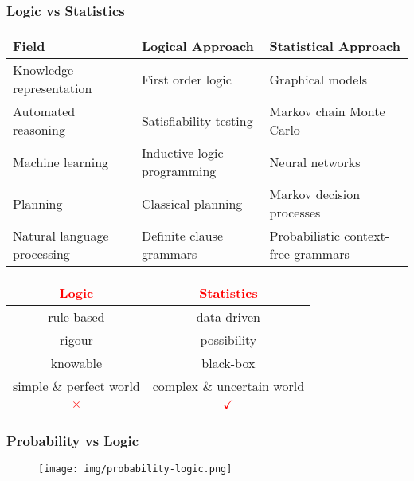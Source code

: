 \documentclass[UTF8,11pt,colorlinks,compress,openany]{beamer}%
\begin{document}
\begin{frame}\frametitle{Logic vs Statistics}%
\begin{table}\centering
\begin{tabu}{p{.29\textwidth}|p{.29\textwidth}|p{.3\textwidth}}
\hline
\textbf{Field} & \textbf{Logical Approach} & \textbf{Statistical Approach}\\
\hline
Knowledge representation & First order logic & Graphical models\\
\hline
Automated reasoning & Satisfiability testing & Markov chain Monte Carlo\\
\hline
Machine learning & Inductive logic programming & Neural networks\\
\hline
Planning & Classical planning & Markov decision processes\\
\hline
Natural language processing & Definite clause grammars & Probabilistic context-free grammars\\
\hline
\end{tabu}
\end{table}
	\begin{table}
		\centering
		\begin{tabu}{c|c}
			\hline
			\large\textcolor{red}{Logic} &\large\textcolor{red}{Statistics}\\
			\hline
			rule-based &data-driven\\
			\hline
			rigour &possibility\\
			\hline
			knowable &black-box\\
			\hline
			simple \& perfect world &complex \& uncertain world\\
			\hline
			\Large\textcolor{red}{$\times$} &\Large\textcolor{red}{$\checkmark$}\\
			\hline
		\end{tabu}%
	\end{table}
\end{frame}

\begin{frame}\frametitle{Probability vs Logic}
\begin{figure}[H]
\texttt{[image: img/probability-logic.png]}	
\end{figure}
\end{frame}
\end{document}
